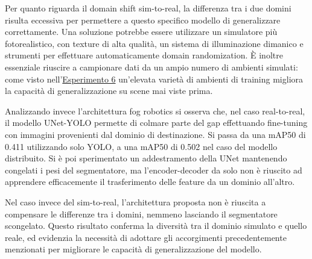 \documentclass[12pt]{report}
\begin{document}
Per quanto riguarda il domain shift sim-to-real, la differenza tra i due domini risulta eccessiva per permettere a questo specifico modello di generalizzare correttamente. Una soluzione potrebbe essere utilizzare un simulatore più fotorealistico, con texture di alta qualità, un sistema di illuminazione dimanico e strumenti per effettuare automaticamente domain randomization. È inoltre essenziale riuscire a campionare dati da un ampio numero di ambienti simulati: come visto nell'\hyperref[sec:esperimento_6]{Esperimento 6} un'elevata varietà di ambienti di training migliora la capacità di generalizzazione su scene mai viste prima.

Analizzando invece l'architettura fog robotics si osserva che, nel caso real-to-real, il modello UNet-YOLO permette di colmare parte del gap effettuando fine-tuning con immagini provenienti dal dominio di destinazione. Si passa da una mAP50 di 0.411 utilizzando solo YOLO, a una mAP50 di 0.502 nel caso del modello distribuito. Si è poi sperimentato un addestramento della UNet mantenendo congelati i pesi del segmentatore, ma l'encoder-decoder da solo non è riuscito ad apprendere efficacemente il trasferimento delle feature da un dominio all'altro.

Nel caso invece del sim-to-real, l'architettura proposta non è riuscita a compensare le differenze tra i domini, nemmeno lasciando il segmentatore scongelato. Questo risultato conferma la diversità tra il dominio simulato e quello reale, ed evidenzia la necessità di adottare gli accorgimenti precedentemente menzionati per migliorare le capacità di generalizzazione del modello.

\beforebibliography



\closingpage
\end{document}
